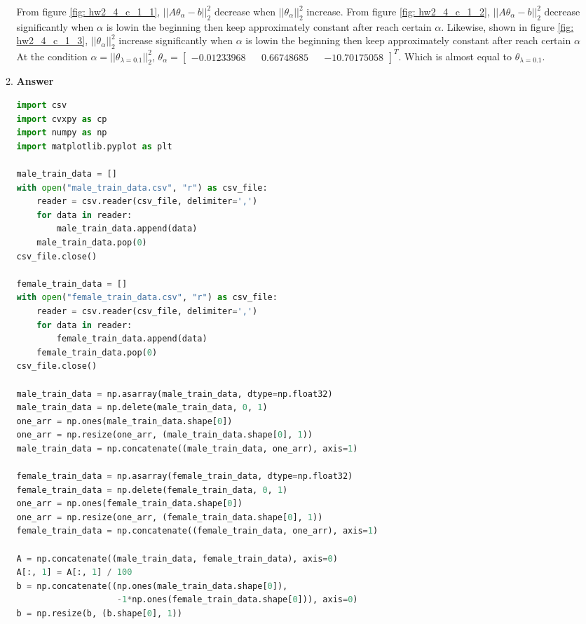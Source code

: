 \documentclass[11pt]{article}
\begin{document}
\begin{enumerate}[label=(\alph*)]
\begin{enumerate}[label=(\roman*)]
From figure \ref{fig: hw2_4_c_1_1}, $||A{\theta}_\alpha -b||_2^2$ decrease when $||{\theta}_\alpha ||_2^2$ increase. 
From figure \ref{fig: hw2_4_c_1_2},  $||A{\theta}_\alpha -b||_2^2$ decrease significantly when $\alpha$ is lowin the beginning then keep approximately constant after reach certain $\alpha$.
Likewise, shown in  figure \ref{fig: hw2_4_c_1_3},  
$||{\theta}_\alpha||_2^2$ increase significantly when $\alpha$ is lowin the beginning then keep approximately constant after reach certain $\alpha$
At the condition $\alpha = ||{\theta}_{\lambda=0.1} ||_2^2$, ${\theta}_{\alpha} = \begin{bmatrix}-0.01233968 && 0.66748685 && -10.70175058\end{bmatrix}^T$. 
Which is almost equal to  ${\theta}_{\lambda=0.1}$.

\item \noindent\textbf{Answer}

\begin{lstlisting}[language=Python, showstringspaces=false]
import csv
import cvxpy as cp
import numpy as np
import matplotlib.pyplot as plt

male_train_data = []
with open("male_train_data.csv", "r") as csv_file:
    reader = csv.reader(csv_file, delimiter=',')
    for data in reader:
        male_train_data.append(data)
    male_train_data.pop(0)
csv_file.close()

female_train_data = []
with open("female_train_data.csv", "r") as csv_file:
    reader = csv.reader(csv_file, delimiter=',')
    for data in reader:
        female_train_data.append(data)
    female_train_data.pop(0)
csv_file.close()

male_train_data = np.asarray(male_train_data, dtype=np.float32)
male_train_data = np.delete(male_train_data, 0, 1)
one_arr = np.ones(male_train_data.shape[0])
one_arr = np.resize(one_arr, (male_train_data.shape[0], 1))
male_train_data = np.concatenate((male_train_data, one_arr), axis=1)

female_train_data = np.asarray(female_train_data, dtype=np.float32)
female_train_data = np.delete(female_train_data, 0, 1)
one_arr = np.ones(female_train_data.shape[0])
one_arr = np.resize(one_arr, (female_train_data.shape[0], 1))
female_train_data = np.concatenate((female_train_data, one_arr), axis=1)

A = np.concatenate((male_train_data, female_train_data), axis=0)
A[:, 1] = A[:, 1] / 100
b = np.concatenate((np.ones(male_train_data.shape[0]),
                    -1*np.ones(female_train_data.shape[0])), axis=0)
b = np.resize(b, (b.shape[0], 1))


\end{lstlisting}
\end{enumerate}
\end{enumerate}
\end{document}
